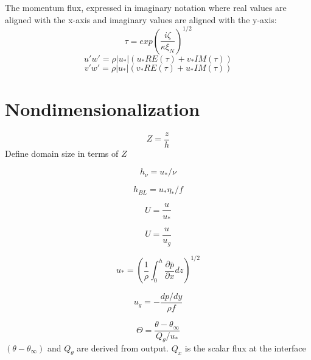 \documentclass[letterpaper,10pt]{report}
\begin{document}
    The momentum flux, expressed in imaginary notation where real values are aligned with the x-axis and imaginary values are aligned with the y-axis:
    \begin{equation}
        \tau = exp(\frac{i \zeta}{\kappa \xi_N})^{1/2}
    \end{equation}
    \begin{equation}
        u'w' = \rho |u_*| (u_* RE(\tau) + v_* IM(\tau))
    \end{equation}
    \begin{equation}
        v'w' = \rho |u_*|(v_* RE(\tau) + u_* IM(\tau))
    \end{equation}
    \newpage
    \section{Nondimensionalization}
    
    \begin{equation}
        Z = \frac{z}{h}
    \end{equation}
    Define domain size in terms of $Z$
    
    \begin{equation}
        h_{\nu} = u_*/\nu
    \end{equation}
    
    \begin{equation}
        h_{BL} = u_* \eta_*/f
    \end{equation}
    
    \begin{equation}
        U = \frac{u}{u_*}
    \end{equation}
    
    \begin{equation}
        U = \frac{u}{u_g}
    \end{equation}
    
    \begin{equation}
        u_* = (\frac{1}{\rho}\int_0^h \frac{\partial \overline{p}}{\partial x} dz)^{1/2} 
    \end{equation}
    
    \begin{equation}
        u_g = - \frac{dp/dy}{\rho f}
    \end{equation}

    \begin{equation}
        \Theta = \frac{\theta - \theta_\infty}{Q_\theta/u_*}
    \end{equation}
    $(\theta - \theta_\infty)$ and $Q_\theta$ are derived from output. $Q_x$ is the scalar flux at the interface
    
\end{document}
